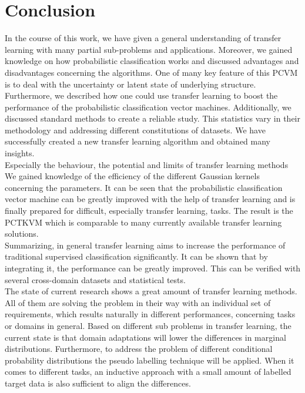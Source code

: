 \chapter{Conclusion}\label{ConChap}	
In the course of this work, we have given a general understanding of transfer learning with many partial sub-problems and applications.
Moreover, we gained knowledge on how probabilistic classification works and discussed advantages and disadvantages concerning the algorithms.
One of many key feature of this \acs{PCVM} is to deal with the uncertainty or latent state of underlying structure.\\
Furthermore, we described how one could use transfer learning to boost the performance of the probabilistic classification vector machines.
Additionally, we discussed standard methods to create a reliable study.
This statistics vary in their methodology and addressing different constitutions of datasets.
We have successfully created a new transfer learning algorithm and obtained many insights.\\
Especially the behaviour, the potential and limits of transfer learning methods
We gained knowledge of the efficiency of the different Gaussian kernels concerning the parameters.
It can be seen that the probabilistic classification vector machine can be greatly improved with the help of transfer learning and is finally prepared for difficult, especially transfer learning, tasks.
The result is the \acl{PCTKVM} which is comparable to many currently available transfer learning solutions.\\ 
Summarizing, in general transfer learning aims to increase the performance of traditional supervised classification significantly.
It can be shown that by integrating it, the performance can be greatly improved.
This can be verified with several cross-domain datasets and statistical tests.\\
The state of current research shows a great amount of transfer learning methods.\cite[p. 33]{Weiss.2016}
All of them are solving the problem in their way with an individual set of requirements, which results naturally in different performances, concerning tasks or domains in general.
Based on different sub problems in transfer learning, the current state is that domain adaptations will lower the differences in marginal distributions. Furthermore, to address the problem of different conditional probability distributions the pseudo labelling technique will be applied. When it comes to different tasks, an inductive approach with a small amount of labelled target data is also sufficient to align the differences.
